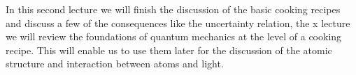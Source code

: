 In this second lecture we will finish the discussion of the basic cooking recipes and discuss a few of the consequences like the uncertainty relation, the x lecture we will review the foundations of quantum mechanics at the level of a cooking recipe. This will enable us to use them later for the discussion of the atomic structure and interaction between atoms and light.